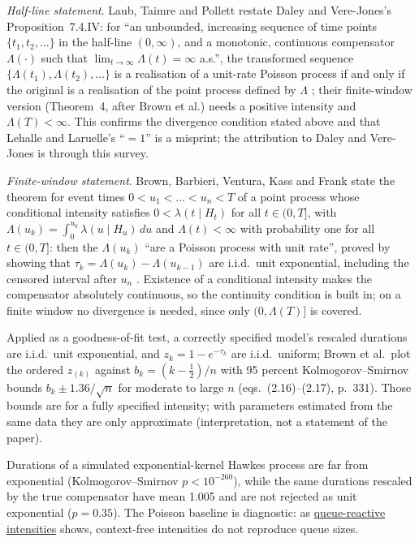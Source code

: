 \begin{qfdefinition}
\emph{Half-line statement}. Laub, Taimre and Pollett restate Daley and Vere-Jones's Proposition~7.4.IV: for ``an unbounded, increasing sequence of time points $\{t_1,t_2,\dots\}$ in the half-line $(0,\infty)$, and a monotonic, continuous compensator $\Lambda(\cdot)$ such that $\lim_{t\to\infty}\Lambda(t)=\infty$ a.s.'', the transformed sequence $\{\Lambda(t_1),\Lambda(t_2),\dots\}$ is a realisation of a unit-rate Poisson process if and only if the original is a realisation of the point process defined by $\Lambda$ \citep[arXiv v1, July 2015, sec.~5.1, Theorem~5, p.~18]{laub-taimre-pollett-2015}; their finite-window version (Theorem~4, after Brown et al.) needs a positive intensity and $\Lambda(T)<\infty$. This confirms the divergence condition stated above and that Lehalle and Laruelle's ``$=1$'' is a misprint; the attribution to Daley and Vere-Jones is through this survey.

\emph{Finite-window statement}. Brown, Barbieri, Ventura, Kass and Frank state the theorem for event times $0<u_1<\dots<u_n<T$ of a point process whose conditional intensity satisfies $0<\lambda(t\mid H_t)$ for all $t\in(0,T]$, with $\Lambda(u_k)=\int_0^{u_k}\lambda(u\mid H_u)\,du$ and $\Lambda(t)<\infty$ with probability one for all $t\in(0,T]$: then the $\Lambda(u_k)$ ``are a Poisson process with unit rate'', proved by showing that $\tau_k=\Lambda(u_k)-\Lambda(u_{k-1})$ are i.i.d.\ unit exponential, including the censored interval after $u_n$ \citep[sec.~2.2, eqs.~(2.6)--(2.11), p.~329]{brown-time-rescaling-2002}. Existence of a conditional intensity makes the compensator absolutely continuous, so the continuity condition is built in; on a finite window no divergence is needed, since only $(0,\Lambda(T)]$ is covered.

Applied as a goodness-of-fit test, a correctly specified model's rescaled durations are i.i.d.\ unit exponential, and $z_k=1-e^{-\tau_k}$ are i.i.d.\ uniform; Brown et al.\ plot the ordered $z_{(k)}$ against $b_k=(k-\tfrac12)/n$ with 95 percent Kolmogorov--Smirnov bounds $b_k\pm1.36/\sqrt n$ for moderate to large $n$ (eqs.~(2.16)--(2.17), p.~331). Those bounds are for a fully specified intensity; with parameters estimated from the same data they are only approximate (interpretation, not a statement of the paper).

 Durations of a simulated exponential-kernel Hawkes process are far from exponential (Kolmogorov--Smirnov $p<10^{-260}$), while the same durations rescaled by the true compensator have mean 1.005 and are not rejected as unit exponential ($p=0.35$). The Poisson baseline is diagnostic: as \hyperref[mod:queue-reactive-intensities]{queue-reactive intensities} shows, context-free intensities do not reproduce queue sizes.


\end{qfdefinition}
